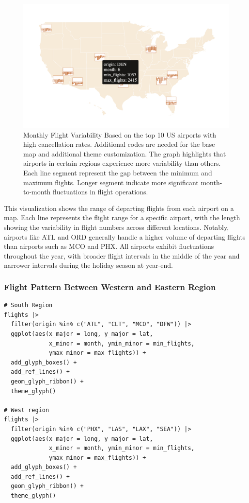 \begin{figure}

{\centering \includegraphics[width=1\linewidth]{figures/monthly-flight-variability} 

}

\caption{Monthly Flight Variability Based on the top 10 US airports with high cancellation rates. Additional codes are needed for the base map and additional theme customization. The graph highlights that airports in certain regions experience more variability than others. Each line segment represent the gap between the minimum and maximum flights. Longer segment indicate more significant month-to-month fluctuations in flight operations.}\label{fig:unnamed-chunk-23}
\end{figure}

This visualization shows the range of departing flights from each airport on a map. Each line represents the flight range for a specific airport, with the length showing the variability in flight numbers across different locations. Notably, airports like ATL and ORD generally handle a higher volume of departing flights than airports such as MCO and PHX. All airports exhibit fluctuations throughout the year, with broader flight intervals in the middle of the year and narrower intervals during the holiday season at year-end.

\hypertarget{flight-pattern-between-western-and-eastern-region}{%
\subsubsection{Flight Pattern Between Western and Eastern Region}\label{flight-pattern-between-western-and-eastern-region}}

\begin{verbatim}
# South Region
flights |> 
  filter(origin %in% c("ATL", "CLT", "MCO", "DFW")) |>
  ggplot(aes(x_major = long, y_major = lat,
             x_minor = month, ymin_minor = min_flights,
             ymax_minor = max_flights)) + 
  add_glyph_boxes() +
  add_ref_lines() +
  geom_glyph_ribbon() +
  theme_glyph()

# West region
flights |> 
  filter(origin %in% c("PHX", "LAS", "LAX", "SEA")) |>
  ggplot(aes(x_major = long, y_major = lat,
             x_minor = month, ymin_minor = min_flights,
             ymax_minor = max_flights)) + 
  add_glyph_boxes() +
  add_ref_lines() +
  geom_glyph_ribbon() +
  theme_glyph()
\end{verbatim}

